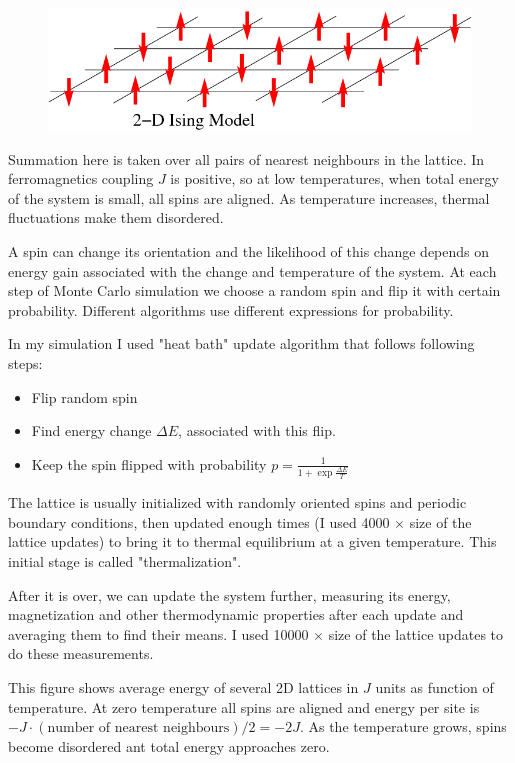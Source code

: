 \documentclass{llncs}
\begin{document}
\begin{figure}
\includegraphics[width=0.8\linewidth]{ising.png}
\centering
\end{figure}

Summation here is taken over all pairs of nearest neighbours in the lattice. In ferromagnetics coupling $J$ is positive, so at low temperatures, when total energy of the system is small, all spins are aligned. As temperature increases, thermal fluctuations make them disordered.

A spin can change its orientation and the likelihood of this change depends on energy gain associated with the change and temperature of the system. At each step of Monte Carlo simulation we choose a random spin and flip it with certain probability. Different algorithms use different expressions for probability. 

In my simulation I used "heat bath" update algorithm that follows following steps:

\begin{itemize}
\item Flip random spin
\item Find energy change $\Delta E$, associated with this flip.
\item Keep the spin flipped with probability $p = \frac{1}{1 + \exp{\frac{\Delta E}{T}}}$
\end{itemize}

The lattice is usually initialized with randomly oriented spins and periodic boundary conditions, then updated enough times (I used 4000 $\times$ size of the lattice updates) to bring it to thermal equilibrium at a given temperature. This initial stage is called "thermalization".

After it is over, we can update the system further, measuring its energy, magnetization and other thermodynamic properties after each update and averaging them to find their means. I used 10000 $\times$ size of the lattice updates to do these measurements.

This figure shows average energy of several 2D lattices in $J$ units as function of temperature. At zero temperature all spins are aligned and energy per site is $-J \cdot (\mbox{number of nearest neighbours}) / 2 = -2 J$. As the temperature grows, spins become disordered ant total energy approaches zero.
\end{document}
